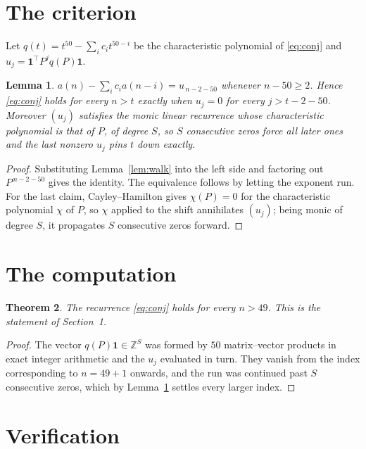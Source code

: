 \documentclass[11pt,a4paper]{article}
\theoremstyle{plain}
\newtheorem{theorem}{Theorem}
\newtheorem{lemma}[theorem]{Lemma}
\theoremstyle{definition}
\begin{document}
\section{The criterion}

Let $q(t)=t^{50}-\sum_i c_i t^{50-i}$ be the characteristic polynomial of
\eqref{eq:conj} and $u_j=\mathbf{1}^{\!\top}P^{j}q(P)\mathbf{1}$.

\begin{lemma}\label{lem:crit}
$a(n)-\sum_i c_i a(n-i)=u_{\,n-2-50}$ whenever $n-50\ge2$. Hence
\eqref{eq:conj} holds for every $n>t$ exactly when $u_j=0$ for every
$j>t-2-50$. Moreover $(u_j)$ satisfies the monic linear recurrence whose
characteristic polynomial is that of $P$, of degree $S$, so $S$ consecutive zeros force all
later ones and the last nonzero $u_j$ pins $t$ down exactly.
\end{lemma}

\begin{proof}
Substituting Lemma~\ref{lem:walk} into the left side and factoring out
$P^{\,n-2-50}$ gives the identity. The equivalence follows by letting the exponent
run. For the last claim, Cayley--Hamilton gives $\chi(P)=0$ for the characteristic
polynomial $\chi$ of $P$, so $\chi$ applied to the shift annihilates $(u_j)$; being monic of
degree $S$, it propagates $S$ consecutive zeros forward.
\end{proof}

\section{The computation}

\begin{theorem}
The recurrence \eqref{eq:conj} holds for every $n>49$. This is the statement of
Section~1.
\end{theorem}

\begin{proof}
The vector $q(P)\mathbf{1}\in\mathbb{Z}^{S}$ was formed by $50$ matrix--vector
products in exact integer arithmetic and the $u_j$ evaluated in turn. They vanish from the
index corresponding to $n=49+1$ onwards, and the run was continued past $S$ consecutive
zeros, which by Lemma~\ref{lem:crit} settles every larger index.
\end{proof}

\section{Verification}
\end{document}
